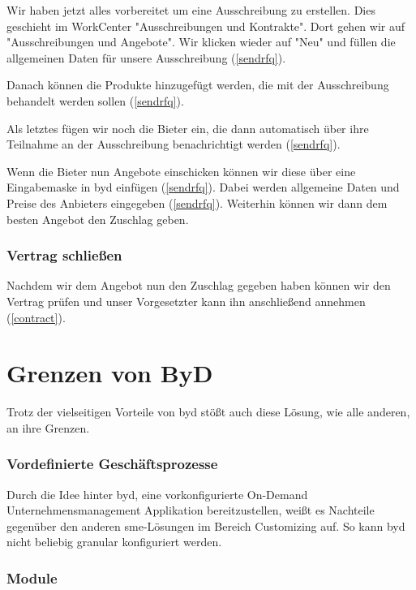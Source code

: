 Wir haben jetzt alles vorbereitet um eine Ausschreibung zu erstellen. Dies geschieht im WorkCenter "Ausschreibungen und Kontrakte". Dort gehen wir auf "Ausschreibungen und Angebote". Wir klicken wieder auf "Neu" und füllen die allgemeinen Daten für unsere Ausschreibung (\ref{sendrfq}). 

Danach können die Produkte hinzugefügt werden, die mit der Ausschreibung behandelt werden sollen (\ref{sendrfq}).

Als letztes fügen wir noch die Bieter ein, die dann automatisch über ihre Teilnahme an der Ausschreibung benachrichtigt werden (\ref{sendrfq}).

Wenn die Bieter nun Angebote einschicken können wir diese über eine Eingabemaske in \gls{byd} einfügen (\ref{sendrfq}). Dabei werden allgemeine Daten und Preise des Anbieters eingegeben (\ref{sendrfq}). Weiterhin können wir dann dem besten Angebot den Zuschlag geben.

\subsubsection{Vertrag schließen}

Nachdem wir dem Angebot nun den Zuschlag gegeben haben können wir den Vertrag prüfen und unser Vorgesetzter kann ihn anschließend annehmen (\ref{contract}).

\section{Grenzen von ByD}

Trotz der vielseitigen Vorteile von \gls{byd} stößt auch diese Lösung, wie alle anderen, an ihre Grenzen.

\subsubsection{Vordefinierte Geschäftsprozesse}

Durch die Idee hinter \gls{byd}, eine vorkonfigurierte On-Demand Unternehmensmanagement Applikation bereitzustellen, weißt es Nachteile gegenüber den anderen \gls{sme}-Lösungen im Bereich Customizing auf. So kann \gls{byd} nicht beliebig granular konfiguriert werden.

\subsubsection{Module}

